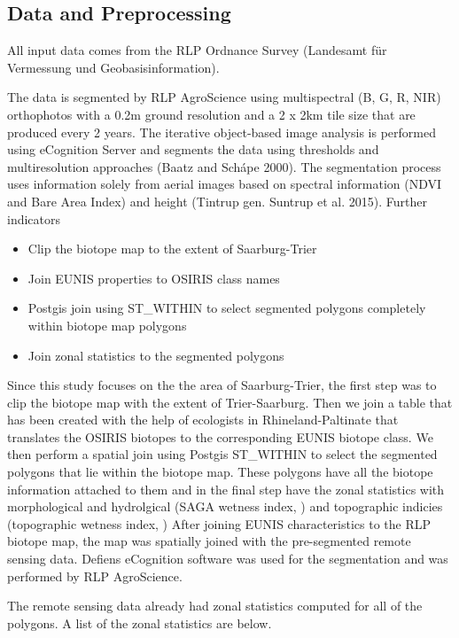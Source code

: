 \documentclass[authoryear, review,12pt,number]{elsarticle}
\begin{document}
\subsection{Data and Preprocessing}
All input data comes from the RLP Ordnance Survey (Landesamt f\"ur Vermessung und
Geobasisinformation).



The data is segmented by RLP AgroScience using
multispectral (B, G, R, NIR) orthophotos with a 0.2m ground resolution and a
2 x 2km tile size that are produced every 2 years. The iterative object-based
image analysis is performed using eCognition Server and segments
the data using thresholds and multiresolution approaches (Baatz and
Sch\'ape 2000). The segmentation process uses information solely from aerial
images based on spectral information (NDVI and Bare Area Index) and height
(Tintrup gen. Suntrup et al. 2015). Further indicators 

\begin{itemize}
    \item Clip the biotope map to the extent of Saarburg-Trier
    \item Join EUNIS properties to OSIRIS class names
    \item Postgis join using ST\_WITHIN to select segmented polygons completely
        within biotope map polygons
    \item Join zonal statistics to the segmented polygons
\end{itemize}
Since this study focuses on the the area of Saarburg-Trier, the first step was
to clip the biotope map with the extent of Trier-Saarburg. Then we join a table
that has been created with the help of ecologists in Rhineland-Paltinate that
translates the OSIRIS biotopes to the corresponding EUNIS biotope class. We then
perform a spatial join using Postgis ST\_WITHIN to select the segmented polygons
that lie within the biotope map. These polygons have all the biotope information
attached to them and in the final step have the zonal statistics with
morphological and hydrolgical (SAGA wetness index, ) and topographic indicies (topographic wetness
index, )
After joining EUNIS characteristics to the RLP biotope map, the map was 
spatially joined with the pre-segmented remote sensing data. Defiens eCognition
software was used for the segmentation and was performed by RLP AgroScience. 

The remote sensing data already had zonal statistics computed for all of the
polygons. A list of the zonal statistics are below.
\end{document}
